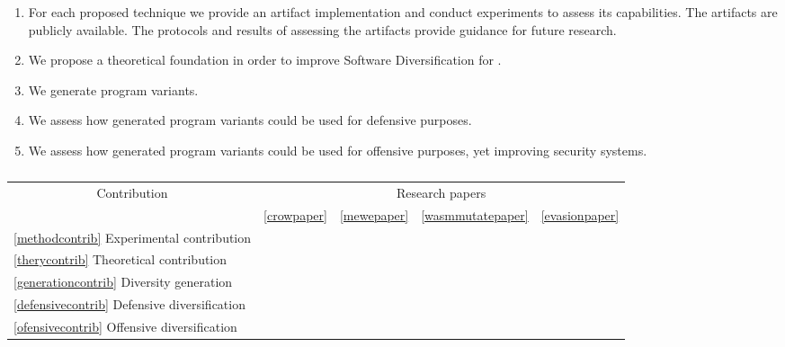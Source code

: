 \begin{enumerate}[label=\textbf{C\arabic*}, ref=C\arabic*]
	\item \label{methodcontrib}  For each proposed technique we provide an artifact implementation and conduct experiments to assess its capabilities. The artifacts are publicly available. The protocols and results of assessing the artifacts provide guidance for future research.
	
	\item \label{therycontrib}  We propose a theoretical foundation in order to improve Software Diversification for \Wasm.
	
	\item \label{generationcontrib}  We generate \Wasm program variants.
	
	\item \label{defensivecontrib}  We assess how generated \Wasm program variants could be used for defensive purposes.
	
	\item \label{ofensivecontrib}  We assess how generated \Wasm program variants could be used for offensive purposes, yet improving security systems.
	
\end{enumerate}

\begin{table}
	\centering
	\begin{tabular}{l | l l l l }
		\multicolumn{1}{c|}{Contribution} & \multicolumn{4}{c}{Research papers} 
		\\
		&  \ref{crowpaper} & \ref{mewepaper} & \ref{wasmmutatepaper} & \ref{evasionpaper} \\
		\hline
		\ref{methodcontrib} Experimental contribution & \checkmark & \checkmark & \checkmark & \checkmark \\
		\ref{therycontrib} Theoretical contribution  & \checkmark &  &  \checkmark &  \\
		\ref{generationcontrib} Diversity generation   & \checkmark & \checkmark & \checkmark & \checkmark\\
		\ref{defensivecontrib} Defensive diversification   & \checkmark & \checkmark & \checkmark\\
		\ref{ofensivecontrib} Offensive diversification  & & & & \checkmark\\
	\end{tabular}
	\label{contribmap}
	\caption{}
\end{table}

